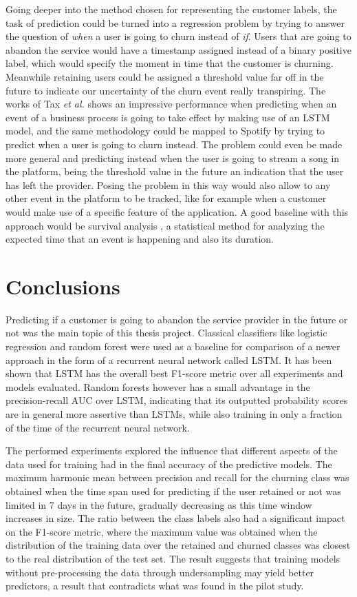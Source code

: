 \documentclass{kththesis}
\begin{document}
Going deeper into the method chosen for representing the customer labels, the task of prediction could be turned into a regression problem by trying to answer the question of \emph{when} a user is going to churn instead of \emph{if}. Users that are going to abandon the service would have a timestamp assigned instead of a binary positive label, which would specify the moment in time that the customer is churning. Meanwhile retaining users could be assigned a threshold value far off in the future to indicate our uncertainty of the churn event really transpiring. The works of Tax \emph{et al.}\citep{Tax2016} shows an impressive performance when predicting when an event of a business process is going to take effect by making use of an LSTM model, and the same methodology could be mapped to Spotify by trying to predict when a user is going to churn instead. The problem could even be made more general and predicting instead when the user is going to stream a song in the platform, being the threshold value in the future an indication that the user has left the provider. Posing the problem in this way would also allow to any other event in the platform to be tracked, like for example when a customer would make use of a specific feature of the application. A good baseline with this approach would be survival analysis \citep{ibrahim2005bayesian}, a statistical method for analyzing the expected time that an event is happening and also its duration.


\chapter{Conclusions}
\label{cha:conclusion}

Predicting if a customer is going to abandon the service provider in the future or not was the main topic of this thesis project. Classical classifiers like logistic regression and random forest were used as a baseline for comparison of a newer approach in the form of a recurrent neural network called LSTM. It has been shown that LSTM has the overall best F1-score metric over all experiments and models evaluated. Random forests however has a small advantage in the precision-recall AUC over LSTM, indicating that its outputted probability scores are in general more assertive than LSTMs, while also training in only a fraction of the time of the recurrent neural network.

The performed experiments explored the influence that different aspects of the data used for training had in the final accuracy of the predictive models. The maximum harmonic mean between precision and recall for the churning class was obtained when the time span used for predicting if the user retained or not was limited in 7 days in the future, gradually decreasing as this time window increases in size. The ratio between the class labels also had a significant impact on the F1-score metric, where the maximum value was obtained when the distribution of the training data over the retained and churned classes was closest to the real distribution of the test set. The result suggests that training models without pre-processing the data through undersampling may yield better predictors, a result that contradicts what was found in the pilot study.
\end{document}
